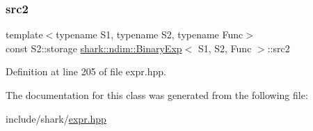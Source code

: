 \subsubsection{\texorpdfstring{src2}{src2}}
{\footnotesize\ttfamily template$<$typename S1, typename S2, typename Func$>$ \\
const S2\+::storage \hyperlink{classshark_1_1ndim_1_1_binary_exp}{shark\+::ndim\+::\+Binary\+Exp}$<$ S1, S2, Func $>$\+::src2\hspace{0.3cm}{\ttfamily [private]}}



Definition at line 205 of file expr.\+hpp.



The documentation for this class was generated from the following file\+:\begin{DoxyCompactItemize}
\item 
include/shark/\hyperlink{expr_8hpp}{expr.\+hpp}\end{DoxyCompactItemize}

